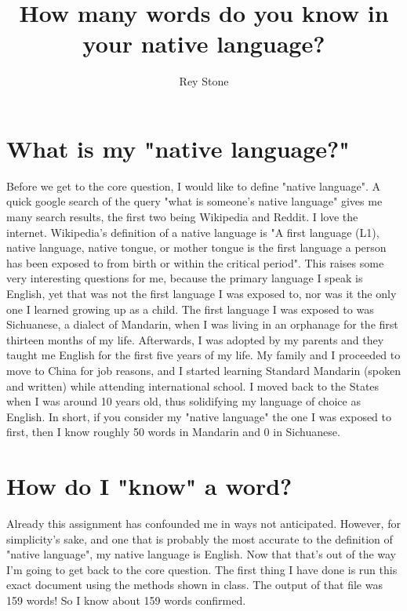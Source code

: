 \documentclass[11pt]{article}
\title{How many words do you know in your native language?}
\author{Rey Stone}
\begin{document}
\onehalfspacing

\maketitle

\section {What is my "native language?"}

Before we get to the core question, I would like to define "native language". A quick google search of the query "what is someone's native language" gives me many search results, the first two being Wikipedia and Reddit. I love the internet. Wikipedia's definition of a native language is "A first language (L1), native language, native tongue, or mother tongue is the first language a person has been exposed to from birth or within the critical period". This raises some very interesting questions for me, because the primary language I speak is English, yet that was not the first language I was exposed to, nor was it the only one I learned growing up as a child. The first language I was exposed to was Sichuanese, a dialect of Mandarin, when I was living in an orphanage for the first thirteen months of my life. Afterwards, I was adopted by my parents and they taught me English for the first five years of my life. My family and I proceeded to move to China for job reasons, and I started learning Standard Mandarin (spoken and written) while attending international school. I moved back to the States when I was around 10 years old, thus solidifying my language of choice as English. In short, if you consider my "native language" the one I was exposed to first, then I know roughly 50 words in Mandarin and 0 in Sichuanese.

\section{How do I "know" a word?}

Already this assignment has confounded me in ways not anticipated. However, for simplicity's sake, and one that is probably the most accurate to the definition of "native language", my native language is English. Now that that's out of the way I'm going to get back to the core question. The first thing I have done is run this exact document using the methods shown in class. The output of that file was 159 words! So I know about 159 words confirmed.
\end{document}
